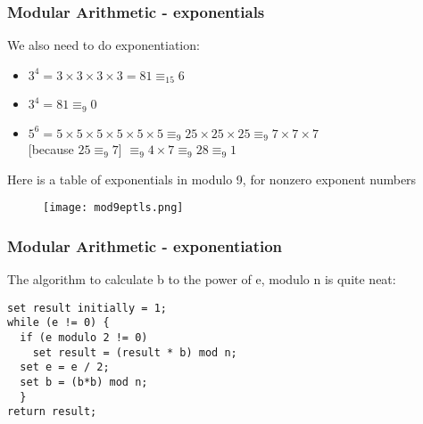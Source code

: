 \documentclass[10pt, hyperref={pdfpagelabels=false}]{beamer}
\begin{document}
\begin{frame}
\frametitle{Modular Arithmetic - exponentials}
We also need to do exponentiation:
\begin{itemize}
\item $3^4 = 3 \times 3 \times 3 \times 3 = 81 \equiv_{15} 6$
\item $3^4 = 81 \equiv_{9} 0$
\item $5^6 = 5 \times 5 \times 5 \times 5 \times 5 \times 5\equiv_{9} 25 \times 25 \times 25 \equiv_{9} 7 \times 7 \times 7$ \\
{\color{brown}[because $25 \equiv_{9} 7$]} $\equiv_{9} 4 \times 7 \equiv_{9} 28 \equiv_{9} 1$
\end{itemize}

Here is a table of exponentials in modulo 9, for nonzero exponent numbers
\begin{figure}
\texttt{[image: mod9eptls.png]}
\end{figure}
\end{frame}

\begin{frame} [fragile]
\frametitle{Modular Arithmetic - exponentiation}

The algorithm to calculate b to the power of e, modulo n is quite neat:
\color{blue}
\begin{verbatim}
set result initially = 1;
while (e != 0) {
  if (e modulo 2 != 0)
    set result = (result * b) mod n;
  set e = e / 2;
  set b = (b*b) mod n;
  }
return result;
\end{verbatim}
\end{frame}
\end{document}
